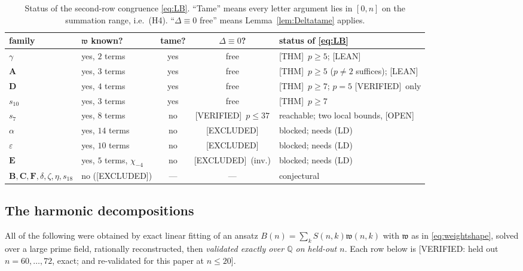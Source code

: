 \documentclass[11pt,reqno]{amsart}
\theoremstyle{plain}
\theoremstyle{definition}
\theoremstyle{remark}
\newcommand{\Q}{\mathbb{Q}}
\newcommand{\Thm}{\textup{\textsf{[THM]}}}
\newcommand{\Lean}{\textup{\textsf{[LEAN]}}}
\newcommand{\Verified}{\textup{\textsf{[VERIFIED]}}}
\newcommand{\VerifiedR}[1]{\textup{\textsf{[VERIFIED: #1]}}}
\newcommand{\Excluded}{\textup{\textsf{[EXCLUDED]}}}
\newcommand{\Open}{\textup{\textsf{[OPEN]}}}
\numberwithin{equation}{section}
\begin{document}
\begin{table}[t]
\footnotesize
\setlength{\tabcolsep}{4pt}
\begin{tabular}{@{}llccl@{}}
\toprule
family & $\mathfrak w$ known? & tame? & $\Delta\equiv0$? & status of \eqref{eq:LB}\\
\midrule
$\gamma$   & yes, $2$ terms  & yes & free & \Thm\ $p\ge5$; \Lean\\
$\mathbf A$& yes, $3$ terms  & yes & free & \Thm\ $p\ge5$ ($p\ne2$ suffices); \Lean\\
$\mathbf D$& yes, $4$ terms  & yes & free & \Thm\ $p\ge7$; $p=5$ \Verified\ only\\
$s_{10}$   & yes, $3$ terms  & yes & free & \Thm\ $p\ge7$\\[2pt]
$s_7$      & yes, $8$ terms  & no  & \Verified\ $p\le37$ & reachable; two local bounds, \Open\\[2pt]
$\alpha$   & yes, $14$ terms & no  & \Excluded & blocked; needs (LD)\\
$\varepsilon$& yes, $10$ terms& no & \Excluded & blocked; needs (LD)\\
$\mathbf E$& yes, $5$ terms, $\chi_{-4}$ & no & \Excluded\ (inv.) & blocked; needs (LD)\\[2pt]
$\mathbf B,\mathbf C,\mathbf F,\delta,\zeta,\eta,s_{18}$
           & no (\Excluded) & --- & --- & conjectural\\
\bottomrule
\end{tabular}
\medskip
\caption{Status of the second-row congruence \eqref{eq:LB}. ``Tame'' means every letter
argument lies in $[0,n]$ on the summation range, i.e.\ (H4). ``$\Delta\equiv0$ free'' means
Lemma~\ref{lem:Deltatame} applies.}
\label{tab:status}
\end{table}

\subsection{The harmonic decompositions}\label{sec:decomps}
All of the following were obtained by exact linear fitting of an ansatz
$B(n)=\sum_kS(n,k)\mathfrak w(n,k)$ with $\mathfrak w$ as in \eqref{eq:weightshape}, solved
over a large prime field, rationally reconstructed, then \emph{validated exactly over $\Q$
on held-out $n$}. Each row below is \VerifiedR{held out $n=60,\dots,72$, exact; and
re-validated for this paper at $n\le20$}.
\end{document}
